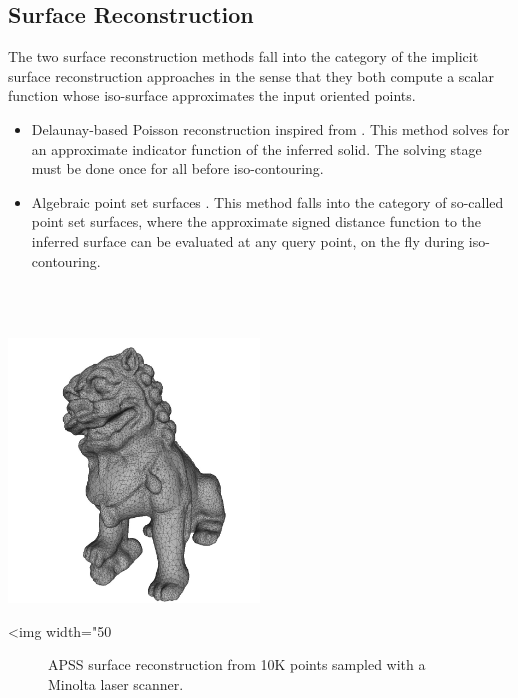 \subsection{Surface Reconstruction}

The two surface reconstruction methods fall into the category of the implicit surface reconstruction approaches in the sense that they both compute a scalar function whose iso-surface approximates the input oriented points.
\begin{itemize}
\item Delaunay-based Poisson reconstruction inspired
      from \cite{Kazhdan06}. This method solves for
      an approximate indicator function of the inferred
      solid. The solving stage must be done once for all
      before iso-contouring. %
\item Algebraic point set surfaces \cite{Guennebaud07}.
      This method falls into the category of so-called
      point set surfaces, where the approximate
      signed distance function to the inferred surface
      can be evaluated at any query point, on the fly
      during iso-contouring.
\end{itemize}

  \\
  \\

\begin{center}
    \label{Surface_reconstruction_points_3-fig-APSS}
    \begin{ccTexOnly}
        \includegraphics[width=0.5\textwidth]{Surface_reconstruction_points_3/APSS} %
    \end{ccTexOnly}
    \begin{ccHtmlOnly}
        <img width="50%
    \end{ccHtmlOnly}
    \begin{figure}[h]
        \caption{APSS surface reconstruction from 10K
                 points sampled with a Minolta laser scanner.}
    \end{figure}
\end{center}

